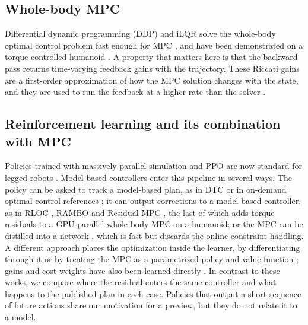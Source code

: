 \documentclass[conference]{IEEEtran}
\begin{document}
\subsection{Whole-body MPC}
Differential dynamic programming (DDP) \cite{mayne1966ddp} and iLQR \cite{li2004ilqr} solve the whole-body optimal control problem fast enough for MPC \cite{tassa2012synthesis,mastalli2020crocoddyl}, and have been demonstrated on a torque-controlled humanoid \cite{dantec2022wbmpc}.
A property that matters here is that the backward pass returns time-varying feedback gains with the trajectory.
These Riccati gains are a first-order approximation of how the MPC solution changes with the state, and they are used to run the feedback at a higher rate than the solver \cite{grandia2019feedback,dantec2022firstorder}.

\subsection{Reinforcement learning and its combination with MPC}
Policies trained with massively parallel simulation \cite{rudin2022minutes} and PPO \cite{schulman2017ppo} are now standard for legged robots \cite{hwangbo2019learning,lee2020learning,radosavovic2024humanoid}.
Model-based controllers enter this pipeline in several ways.
The policy can be asked to track a model-based plan, as in DTC \cite{jenelten2024dtc} or in on-demand optimal control references \cite{kang2023rlmodel}; it can output corrections to a model-based controller, as in RLOC \cite{gangapurwala2022rloc}, RAMBO \cite{cheng2025rambo} and Residual MPC \cite{jeon2025residualmpc}, the last of which adds torque residuals to a GPU-parallel whole-body MPC on a humanoid; or the MPC can be distilled into a network \cite{carius2020mpcnet,reske2021imitation}, which is fast but discards the online constraint handling.
A different approach places the optimization inside the learner, by differentiating through it \cite{amos2017optnet,amos2018diffmpc,romero2024acmpc} or by treating the MPC as a parametrized policy and value function \cite{gros2020nmpcrl}; gains and cost weights have also been learned directly \cite{buchli2011variable,marco2016lqr}.
In contrast to these works, we compare where the residual enters the same controller and what happens to the published plan in each case.
Policies that output a short sequence of future actions \cite{zhao2023act,chi2023diffusion} share our motivation for a preview, but they do not relate it to a model.
\end{document}
